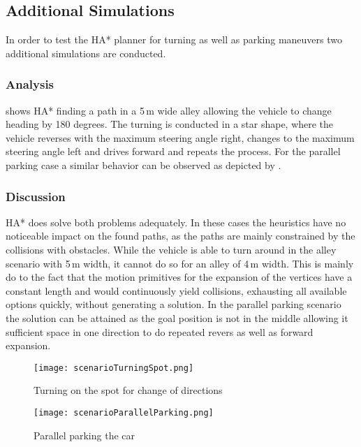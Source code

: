 \subsection{Additional Simulations}
In order to test the HA* planner for turning as well as parking maneuvers two additional simulations are conducted.

\subsubsection{Analysis}
 shows HA* finding a path in a 5\,m wide alley allowing the vehicle to change heading by 180 degrees. The turning is conducted in a star shape, where the vehicle reverses with the maximum steering angle right, changes to the maximum steering angle left and drives forward and repeats the process. For the parallel parking case a similar behavior can be observed as depicted by .

\subsubsection{Discussion}
HA* does solve both problems adequately. In these cases the heuristics have no noticeable impact on the found paths, as the paths are mainly constrained by the collisions with obstacles. While the vehicle is able to turn around in the alley scenario with 5\,m width, it cannot do so for an alley of 4\,m width. This is mainly do to the fact that the motion primitives for the expansion of the vertices have a constant length and would continuously yield collisions, exhausting all available options quickly, without generating a solution. In the parallel parking scenario the solution can be attained as the goal position is not in the middle allowing it sufficient space in one direction to do repeated revers as well as forward expansion.

\begin{figure}[h]
    \texttt{[image: scenarioTurningSpot.png]}
    \caption{Turning on the spot for change of directions}
    \label{fig:scenarioTurningSpot}
\end{figure}

\begin{figure}[h]
    \texttt{[image: scenarioParallelParking.png]}
    \caption{Parallel parking the car}
    \label{fig:scenarioParallelParking}
\end{figure}

